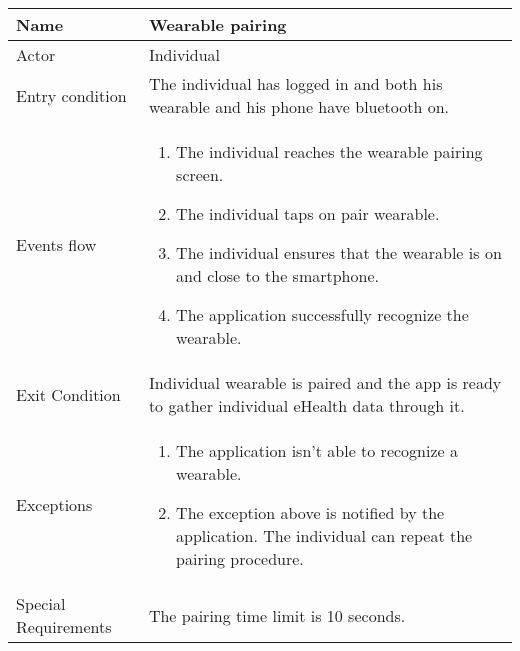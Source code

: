\begin{tabular}{|l|p{13cm}|}
    \hline
    Name & Wearable pairing
    \\ \hline
    Actor & Individual
    \\ \hline 
    Entry condition & The individual has logged in and both his wearable and his phone have bluetooth on.
    \\ \hline
    Events flow &
    \begin{enumerate}
    \item The individual reaches the wearable pairing screen.
    \item The individual taps on pair wearable.
    \item The individual ensures that the wearable is on and close to the smartphone.
    \item The application successfully recognize the wearable.
    \end{enumerate}
     \\ \hline
     Exit Condition & Individual wearable is paired and the app is ready to gather individual eHealth data through it.
     \\
    \hline
    Exceptions &
        \begin{enumerate}
    \item The application isn't able to recognize a wearable. 
    \item The exception above is notified by the application. The individual can repeat the pairing procedure.
    \end{enumerate}
      \\
    \hline
    Special Requirements & The pairing time limit is 10 seconds.
\end{tabular}



